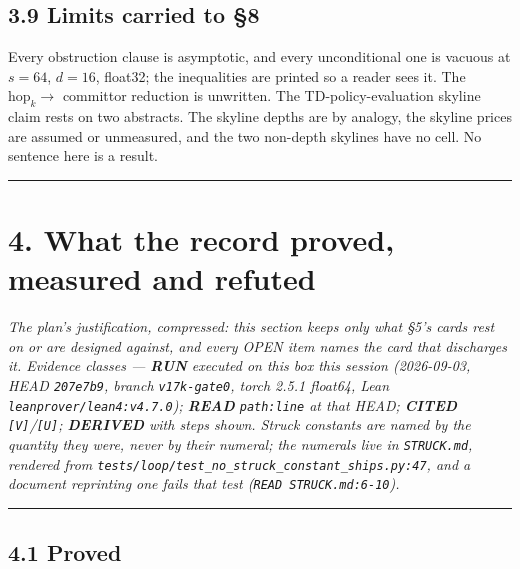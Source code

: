 \documentclass[11pt,a4paper]{article}
\theoremstyle{plain}
\theoremstyle{definition}
\theoremstyle{remark}
\begin{document}
\subsection{3.9 Limits carried to §8}\label{limits-carried-to-8-1}

Every obstruction clause is asymptotic, and every unconditional one is
vacuous at \(s=64\), \(d=16\), float32; the inequalities are printed so
a reader sees it. The \(\mathrm{hop}_k\to\) committor reduction is
unwritten. The TD-policy-evaluation skyline claim rests on two
abstracts. The skyline depths are by analogy, the skyline prices are
assumed or unmeasured, and the two non-depth skylines have no cell. No
sentence here is a result.

\begin{center}\rule{0.5\linewidth}{0.5pt}\end{center}

\section{4. What the record proved, measured and
refuted}\label{what-the-record-proved-measured-and-refuted}

\emph{The plan's justification, compressed: this section keeps only what
§5's cards rest on or are designed against, and every OPEN item names
the card that discharges it. Evidence classes --- \textbf{RUN} executed
on this box this session (2026-09-03, HEAD \texttt{207e7b9}, branch
\texttt{v17k-gate0}, torch 2.5.1 float64, Lean
\texttt{leanprover/lean4:v4.7.0}); \textbf{READ} \texttt{path:line} at
that HEAD; \textbf{CITED} \texttt{{[}V{]}}/\texttt{{[}U{]}};
\textbf{DERIVED} with steps shown. Struck constants are named by the
quantity they were, never by their numeral; the numerals live in
\texttt{STRUCK.md}, rendered from
\texttt{tests/loop/test\_no\_struck\_constant\_ships.py:47}, and a
document reprinting one fails that test
(\texttt{READ\ STRUCK.md:6-10}).}

\begin{center}\rule{0.5\linewidth}{0.5pt}\end{center}

\subsection{4.1 Proved}\label{proved}
\end{document}
